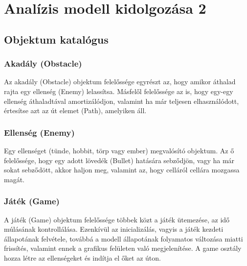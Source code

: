 %
\chapter{Analízis modell kidolgozása 2}

\thispagestyle{fancy}

\section{Objektum katalógus}


%



\subsection{Akadály (Obstacle)}
Az akadály (Obstacle) objektum felelőssége egyrészt az, hogy amikor áthalad rajta egy ellenség (Enemy) lelassítsa. Másfelől felelőssége az is, hogy egy-egy ellenség  áthaladtával amortizálódjon, valamint ha már teljesen elhasználódott, értesítse azt az út elemet (Path), amelyiken áll.
\subsection{Ellenség (Enemy)}
	Egy ellenséget (tünde, hobbit, törp vagy ember) megvalósító objektum. Az ő felelőssége, hogy egy adott lövedék (Bullet) hatására sebződjön, vagy ha már sokat sebződött, akkor haljon meg, valamint az, hogy celláról cellára mozgassa magát.

\subsection{Játék (Game)}
A játék (Game) objektum felelőssége többek közt a játék ütemezése, az idő múlásának kontrollálása. Ezenkívül az inicializálás, vagyis a játék kezdeti állapotának felvétele, továbbá a modell állapotának folyamatos változása miatti frissítés, valamint ennek a grafikus felületen való megjelenítése. A game osztály hozza létre az ellenségeket és indítja el őket az úton.

